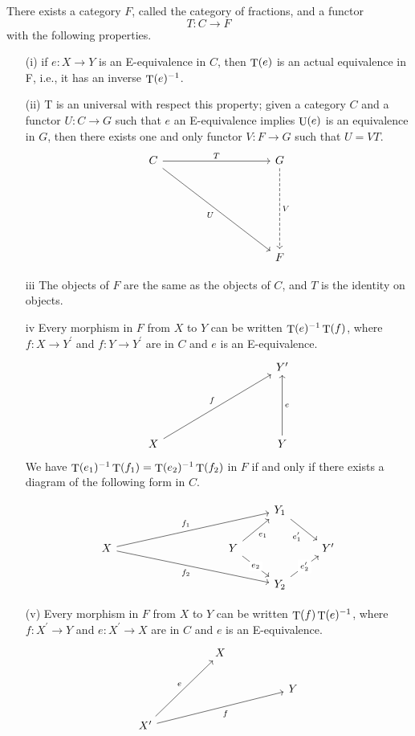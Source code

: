 \documentclass[../main]{subfiles}
\begin{document}
\begin{theorem} \label{thm:p3ch14.1}
There exists a category $F$, called the category of fractions, and a functor
$$
  T\colon C \to F 
$$ with the following properties.

\begin{enumerate} 
  \item [(i)] if $e\colon X \to Y $ is an E-equivalence in $C$, then  $\mathop{\mathrm{T}}(e)$ is an actual equivalence in F, i.e., it has an inverse  $\mathop{\mathrm{T}}(e)^{-1}$.
  \item [(ii)] T is an universal with respect this property; given a category $C$ and a functor $U\colon C \to G$ such that $e$ an E-equivalence implies  $\mathop{\mathrm{U}}(e)$ is an equivalence in $G$, then there exists one and only functor  $V\colon F \to G  $ such that $U = VT$. 
\[\begin{tikzcd}
	C &&&& G \\
	\\
	\\
	\\
	&&&& F
	\arrow["T", from=1-1, to=1-5]
	\arrow["U"', from=1-1, to=5-5]
	\arrow["V", dashed, from=1-5, to=5-5]
\end{tikzcd}\]
\item [iii] The objects of $F$ are the same as the objects of $C$, and  $T$ is the identity on objects.
\item [iv] Every morphism in $F$ from $X$ to  $Y$ can be written  $\mathop{\mathrm{T}}(e)^{-1}\mathop{\mathrm{T}}(f)$, where $f\colon X \to Y^{\prime}  $ and $f\colon Y \to Y^{\prime}  $ are in $C$ and  $e$ is an E-equivalence. \\
  \[\begin{tikzcd}
	&&&& {Y'} \\
	\\
	\\
	X &&&& Y
	\arrow["f", from=4-1, to=1-5]
	\arrow["e"', from=4-5, to=1-5]
\end{tikzcd}\]
We have $\mathop{\mathrm{T}}(e_1)^{-1}\mathop{\mathrm{\mathop{\mathrm{T}}}}(f_1)=\mathop{\mathrm{T}}(e_2)^{-1}\mathop{\mathrm{T}}(f_2)$ in $F$ if and only if there exists a diagram of the following form in $C$. 

\[\begin{tikzcd}
	&&&&& {Y_1} \\
	X &&&& Y && {Y'} \\
	&&&&& {Y_2}
	\arrow["{f_1}", from=2-1, to=1-6]
	\arrow["{f_2}"', from=2-1, to=3-6]
	\arrow["{e_1}"', from=2-5, to=1-6]
	\arrow["{e'_1}"', from=1-6, to=2-7]
	\arrow["{e'_2}"{description}, from=3-6, to=2-7]
	\arrow["{e_2}"{description}, from=2-5, to=3-6]
\end{tikzcd}\]
\item [(v)] Every morphism in $F$ from $X$ to $Y$ can be written  $\mathop{\mathrm{T}}(f)\mathop{\mathrm{T}}(e)^{-1}$, where $f\colon X^{\prime} \to Y  $ and $e\colon X^{\prime} \to X  $ are in $C$ and  $e$ is an E-equivalence.
\[\begin{tikzcd}
	&& X \\
	&&&& Y \\
	{X'}
	\arrow["e", from=3-1, to=1-3]
	\arrow["f"', from=3-1, to=2-5]
\end{tikzcd}\]
\end{enumerate}
\end{theorem}
\end{document}

